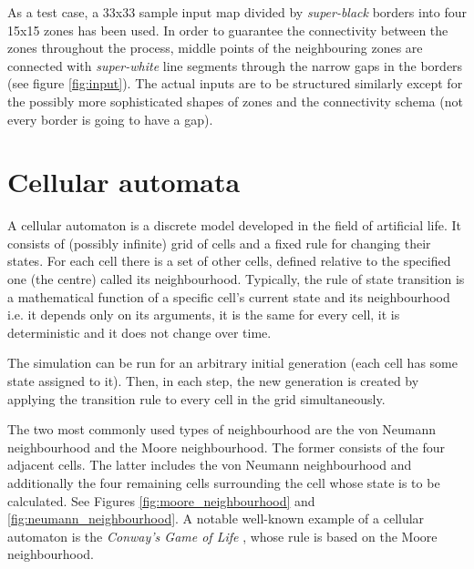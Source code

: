 \documentclass[a4paper, 11pt]{article} %
\begin{document}
As a test case, a 33x33 sample input map divided by \emph{super-black} borders into four 15x15 zones has been used. In order to guarantee the connectivity between the zones throughout the process, middle points of the neighbouring zones are connected with \emph{super-white} line segments through the narrow gaps in the borders (see figure \ref{fig:input}). The actual inputs are to be structured similarly except for the possibly more sophisticated shapes of zones and the connectivity schema (not every border is going to have a gap).


\section*{Cellular automata}

A cellular automaton is a discrete model developed in the field of artificial life. It consists of (possibly infinite) grid of cells and a fixed rule for changing their states. For each cell there is a set of other cells, defined relative to the specified one (the centre) called its neighbourhood. Typically, the rule of state transition is a mathematical function of a specific cell's current state and its neighbourhood i.e. it depends only on its arguments, it is the same for every cell, it is deterministic and it does not change over time. 

The simulation can be run for an arbitrary initial generation (each cell has some state assigned to it). Then, in each step, the new generation is created by applying the transition rule to every cell in the grid simultaneously.

The two most commonly used types of neighbourhood are the von Neumann neighbourhood and the Moore neighbourhood. The former consists of the four adjacent cells. The latter includes the von Neumann neighbourhood and additionally the four remaining cells surrounding the cell whose state is to be calculated. \cite{wiki} See Figures \ref{fig:moore_neighbourhood} and \ref{fig:neumann_neighbourhood}. A notable well-known example of a cellular automaton is the \emph{Conway's Game of Life} \cite{conway}, whose rule is based on the Moore neighbourhood.
\end{document}
